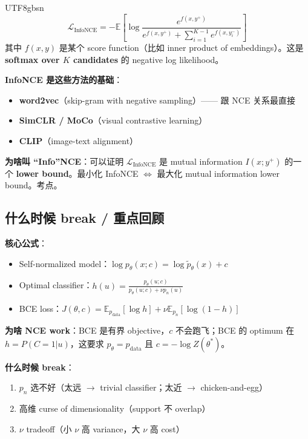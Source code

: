\documentclass[11pt]{article}
\begin{document}
\begin{CJK}{UTF8}{gbsn}
\[
\mathcal{L}_{\text{InfoNCE}} = -\mathbb{E}\!\left[\log \frac{e^{f(x, y^+)}}{e^{f(x, y^+)} + \sum_{i=1}^{K-1} e^{f(x, y_i^-)}}\right]
\]
其中 $f(x, y)$ 是某个 score function（比如 inner product of embeddings）。这是 \textbf{softmax over $K$ candidates} 的 negative log likelihood。

\textbf{InfoNCE 是这些方法的基础}：
\begin{itemize}[nosep]
  \item \textbf{word2vec}（skip-gram with negative sampling）—— 跟 NCE 关系最直接
  \item \textbf{SimCLR / MoCo}（visual contrastive learning）
  \item \textbf{CLIP}（image-text alignment）
\end{itemize}

\textbf{为啥叫 ``Info''NCE}：可以证明 $\mathcal{L}_{\text{InfoNCE}}$ 是 mutual information $I(x; y^+)$ 的一个 \textbf{lower bound}。最小化 InfoNCE $\Leftrightarrow$ 最大化 mutual information lower bound。考点。

\subsection{什么时候 break / 重点回顾}

\textbf{核心公式}：
\begin{itemize}[nosep]
  \item Self-normalized model：$\log p_\theta(x; c) = \log \tilde{p}_\theta(x) + c$
  \item Optimal classifier：$h(u) = \frac{p_\theta(u; c)}{p_\theta(u; c) + \nu p_n(u)}$
  \item BCE loss：$J(\theta, c) = \mathbb{E}_{p_{\text{data}}}[\log h] + \nu \mathbb{E}_{p_n}[\log(1-h)]$
\end{itemize}

\textbf{为啥 NCE work}：BCE 是有界 objective，$c$ 不会跑飞；BCE 的 optimum 在 $h = P(C=1|u)$，这要求 $p_\theta = p_{\text{data}}$ 且 $c = -\log Z(\theta^*)$。

\textbf{什么时候 break}：
\begin{enumerate}[nosep]
  \item $p_n$ 选不好（太远 $\to$ trivial classifier；太近 $\to$ chicken-and-egg）
  \item 高维 curse of dimensionality（support 不 overlap）
  \item $\nu$ tradeoff（小 $\nu$ 高 variance，大 $\nu$ 高 cost）
\end{enumerate}


\end{CJK}
\end{document}
